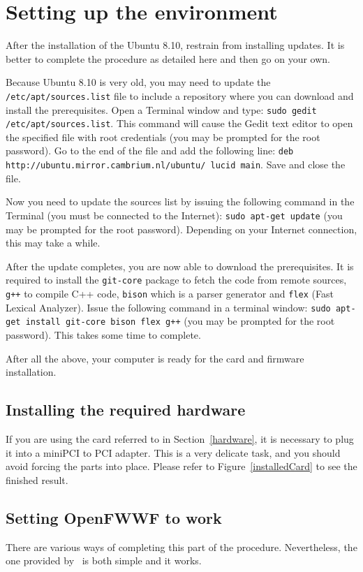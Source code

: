 \documentclass[conference]{IEEEtran}
\begin{document}
\section{Setting up the environment}
After the installation of the Ubuntu 8.10, restrain from installing updates. It is better to complete the procedure as detailed here and then go on your own.

Because Ubuntu 8.10 is very old, you may need to update the \texttt{/etc/apt/sources.list} file to include a repository where you can download and install the prerequisites. Open a Terminal window and type: \texttt{sudo gedit /etc/apt/sources.list}. This command will cause the Gedit text editor to open the specified file with root credentials (you may be prompted for the root password). Go to the end of the file and add the following line: \texttt{deb http://ubuntu.mirror.cambrium.nl/ubuntu/ lucid main}. Save and close the file.

Now you need to update the sources list by issuing the following command in the Terminal (you must be connected to the Internet): \texttt{sudo apt-get update} (you may be prompted for the root password). Depending on your Internet connection, this may take a while.

After the update completes, you are now able to download the prerequisites. It is required to install the \texttt{git-core} package to fetch the code from remote sources, \texttt{g++} to compile C++ code, \texttt{bison} which is a parser generator and \texttt{flex} (Fast Lexical Analyzer). Issue the following command in a terminal window: \texttt{sudo apt-get install git-core bison flex g++} (you may be prompted for the root password). This takes some time to complete.

After all the above, your computer is ready for the card and firmware installation.

\subsection{Installing the required hardware}

If you are using the card referred to in Section~\ref{hardware}, it is necessary to plug it into a miniPCI to PCI adapter. This is a very delicate task, and you should avoid forcing the parts into place. Please refer to Figure~\ref{installedCard} to see the finished result.

\subsection{Setting OpenFWWF to work}
There are various ways of completing this part of the procedure. Nevertheless, the one provided by~\cite{gnewsense} is both simple and it works.
\end{document}

